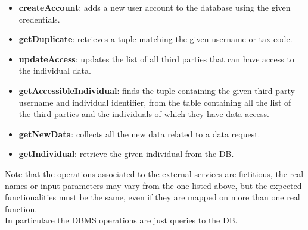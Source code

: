 \begin{itemize}
\begin{itemize}
\item \textbf{createAccount}: adds a new user account to the database using the given credentials.
\item \textbf{getDuplicate}: retrieves a tuple matching the given username or tax code.
\item \textbf{updateAccess}: updates the list of all third parties that can have access to the individual data.
\item \textbf{getAccessibleIndividual}: finds the tuple containing the given third party username and individual identifier, from the table containing all the list of the third parties and the individuals of which they have data access.
\item \textbf{getNewData}: collects all the new data related to a data request.
\item \textbf{getIndividual}: retrieve the given individual from the DB.
\end{itemize}
\end{itemize}
Note that the operations associated to the external services are fictitious, the real names or input parameters may vary from the one listed above, but the expected functionalities must be the same, even if they are mapped on more than one real function.\\
In particulare the DBMS operations are just queries to the DB.

